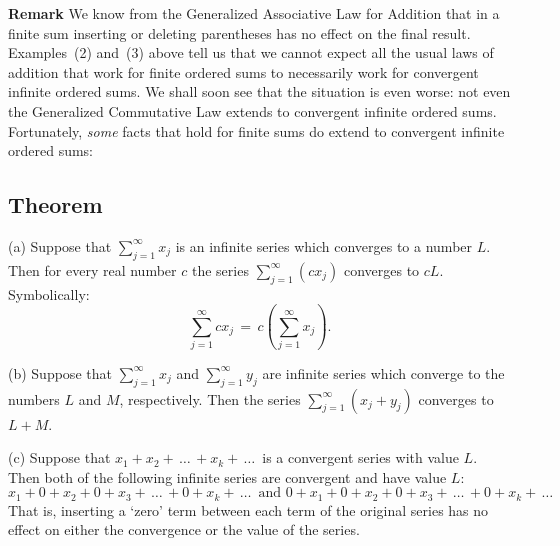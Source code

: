 \V

        {\bf Remark} We know from the Generalized Associative Law for Addition that in a finite sum inserting or deleting parentheses has no effect on the final result.
    Examples~(2) and~(3) above tell us that we cannot expect all the usual laws of addition that work for finite ordered sums to necessarily work for convergent infinite ordered sums.
    We shall soon see that the situation is even worse: not even the Generalized Commutative Law extends to convergent infinite ordered sums.
    Fortunately, {\em some} facts that hold for finite sums do extend to convergent infinite ordered sums:

\V
\V

        \subsection{\small{{\bf Theorem}}}
        \label{ThmG30.90}

\V

\hspace*{\parindent}(a) Suppose that $\sum_{j=1}^{{\infty}} x_{j}$ is an infinite series which converges to a number $L$.
    Then for every real number $c$ the series $\sum_{j=1}^{{\infty}} (cx_{j})$ converges to $cL$.
    Symbolically:
        \begin{displaymath}
        \sum_{j=1}^{{\infty}} cx_{j} \,=\, c\left(\sum_{j=1}^{{\infty}} x_{j}\right).
        \end{displaymath}

\V

        (b) Suppose that $\sum_{j=1}^{{\infty}} x_{j}$ and $\sum_{j=1}^{{\infty}} y_{j}$ are infinite series which converge to the numbers $L$ and $M$, respectively.
    Then the series $\sum_{j=1}^{{\infty}} (x_{j}+y_{j})$ converges to $L+M$.

\V

        (c) Suppose that $x_{1} + x_{2} + \,{\ldots}\,+ x_{k} + \,{\ldots}\,$ is a convergent series with value $L$.
    Then both of the following infinite series are convergent and have value $L$:
        \begin{displaymath}
        x_{1} + 0 + x_{2} + 0 + x_{3} +\,{\ldots}\,+ 0 + x_{k} + \,{\ldots}\,
    \mbox{ and }
       0 + x_{1} + 0 + x_{2} + 0 + x_{3} +\,{\ldots}\,+ 0 + x_{k} + \,{\ldots}\,
        \end{displaymath}
    That is, inserting a `zero' term between each term of the original series has no effect on either the convergence or the value of the series.

